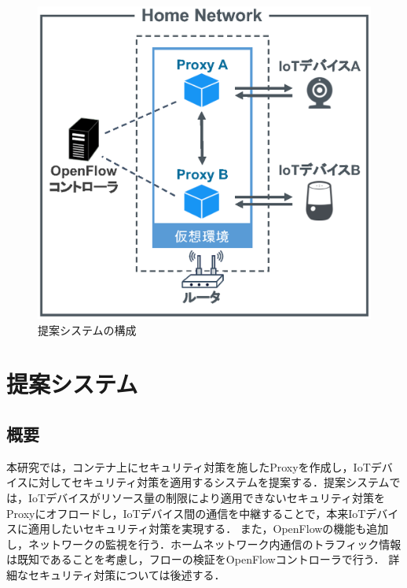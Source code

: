 \documentclass[Japanese]{dicomopapers}
\begin{document}
\begin{figure}[!tb]
	\centering
	\includegraphics[width=\linewidth]{img/system.eps}
	\caption{提案システムの構成}
	\label{fig:system}
\end{figure}


\section{提案システム}
\subsection{概要}
本研究では，コンテナ上にセキュリティ対策を施したProxyを作成し，IoTデバイスに対してセキュリティ対策を適用するシステムを提案する．提案システムでは，IoTデバイスがリソース量の制限により適用できないセキュリティ対策をProxyにオフロードし，IoTデバイス間の通信を中継することで，本来IoTデバイスに適用したいセキュリティ対策を実現する．
また，OpenFlowの機能も追加し，ネットワークの監視を行う．ホームネットワーク内通信のトラフィック情報は既知であることを考慮し，フローの検証をOpenFlowコントローラで行う．
詳細なセキュリティ対策については後述する．
\end{document}
